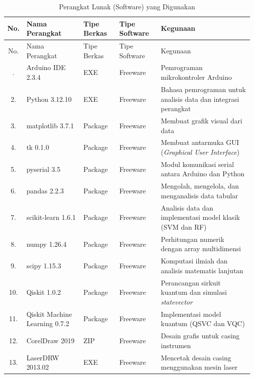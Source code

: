 \renewcommand{\arraystretch}{1.3}
\begin{longtable}{|c|p{2.2cm}|p{1.4cm}|p{1.4cm}|p{5.8cm}|}
    \caption{Perangkat Lunak (Software) yang Digunakan} \label{tab:software} \\
    \hline
    No. & Nama Perangkat & Tipe Berkas & Tipe Software & Kegunaan \\ \hline
    \endfirsthead
    \hline
    No. & Nama Perangkat & Tipe Berkas & Tipe Software & Kegunaan \\ \hline
    \endhead
    \hline
    \endfoot
    \hline
    \endlastfoot
    1. & Arduino IDE 2.3.4 & EXE & Freeware & Pemrograman mikrokontroler Arduino \\ \hline
    2. & Python 3.12.10 & EXE & Freeware & Bahasa pemrograman untuk analisis data dan integrasi perangkat \\ \hline
    3. & matplotlib 3.7.1 & Package & Freeware & Membuat grafik visual dari data \\ \hline
    4. & tk 0.1.0 & Package & Freeware & Membuat antarmuka GUI (\textit{Graphical User Interface}) \\ \hline
    5. & pyserial 3.5 & Package & Freeware & Modul komunikasi serial antara Arduino dan Python \\ \hline
    6. & pandas 2.2.3 & Package & Freeware & Mengolah, mengelola, dan menganalisis data tabular \\ \hline
    7. & scikit-learn 1.6.1 & Package & Freeware & Analisis data dan implementasi model klasik (SVM dan RF) \\ \hline
    8. & numpy 1.26.4 & Package & Freeware & Perhitungan numerik dengan array multidimensi \\ \hline
    9. & scipy 1.15.3 & Package & Freeware & Komputasi ilmiah dan analisis matematis lanjutan \\ \hline
    10. & Qiskit 1.0.2 & Package & Freeware & Perancangan sirkuit kuantum dan simulasi \textit{statevector} \\ \hline
    11. & Qiskit Machine Learning 0.7.2 & Package & Freeware & Implementasi model kuantum (QSVC dan VQC) \\ \hline
    12. & CorelDraw 2019 & ZIP & Freeware & Desain grafis untuk casing instrumen \\ \hline
    13. & LaserDRW 2013.02 & EXE & Freeware & Mencetak desain casing menggunakan mesin laser \\ \hline
\end{longtable}
\renewcommand{\arraystretch}{1.0}

